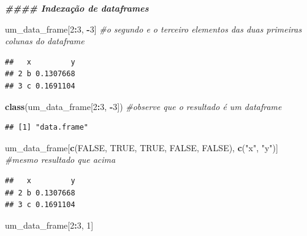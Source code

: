 \documentclass[
]{book}
\newenvironment{Shaded}{\begin{snugshade}}{\end{snugshade}}
\newcommand{\CommentTok}[1]{\textcolor[rgb]{0.56,0.35,0.01}{\textit{#1}}}
\newcommand{\ConstantTok}[1]{\textcolor[rgb]{0.56,0.35,0.01}{#1}}
\newcommand{\DecValTok}[1]{\textcolor[rgb]{0.00,0.00,0.81}{#1}}
\newcommand{\DocumentationTok}[1]{\textcolor[rgb]{0.56,0.35,0.01}{\textbf{\textit{#1}}}}
\newcommand{\FunctionTok}[1]{\textcolor[rgb]{0.13,0.29,0.53}{\textbf{#1}}}
\newcommand{\NormalTok}[1]{#1}
\newcommand{\SpecialCharTok}[1]{\textcolor[rgb]{0.81,0.36,0.00}{\textbf{#1}}}
\newcommand{\StringTok}[1]{\textcolor[rgb]{0.31,0.60,0.02}{#1}}
\begin{document}
\begin{Shaded}
\begin{Highlighting}[]
\DocumentationTok{\#\#\#\# Indexação de dataframes}

\NormalTok{um\_data\_frame[}\DecValTok{2}\SpecialCharTok{:}\DecValTok{3}\NormalTok{, }\SpecialCharTok{{-}}\DecValTok{3}\NormalTok{] }\CommentTok{\#o segundo e o terceiro elementos das duas primeiras colunas do dataframe}
\end{Highlighting}
\end{Shaded}

\begin{verbatim}
##   x         y
## 2 b 0.1307668
## 3 c 0.1691104
\end{verbatim}

\begin{Shaded}
\begin{Highlighting}[]
\FunctionTok{class}\NormalTok{(um\_data\_frame[}\DecValTok{2}\SpecialCharTok{:}\DecValTok{3}\NormalTok{, }\SpecialCharTok{{-}}\DecValTok{3}\NormalTok{]) }\CommentTok{\#observe que o resultado é um dataframe}
\end{Highlighting}
\end{Shaded}

\begin{verbatim}
## [1] "data.frame"
\end{verbatim}

\begin{Shaded}
\begin{Highlighting}[]
\NormalTok{um\_data\_frame[}\FunctionTok{c}\NormalTok{(}\ConstantTok{FALSE}\NormalTok{, }\ConstantTok{TRUE}\NormalTok{, }\ConstantTok{TRUE}\NormalTok{, }\ConstantTok{FALSE}\NormalTok{, }\ConstantTok{FALSE}\NormalTok{), }\FunctionTok{c}\NormalTok{(}\StringTok{"x"}\NormalTok{, }\StringTok{"y"}\NormalTok{)] }\CommentTok{\#mesmo resultado que acima}
\end{Highlighting}
\end{Shaded}

\begin{verbatim}
##   x         y
## 2 b 0.1307668
## 3 c 0.1691104
\end{verbatim}

\begin{Shaded}
\begin{Highlighting}[]
\NormalTok{um\_data\_frame[}\DecValTok{2}\SpecialCharTok{:}\DecValTok{3}\NormalTok{, }\DecValTok{1}\NormalTok{]}
\end{Highlighting}
\end{Shaded}
\end{document}
